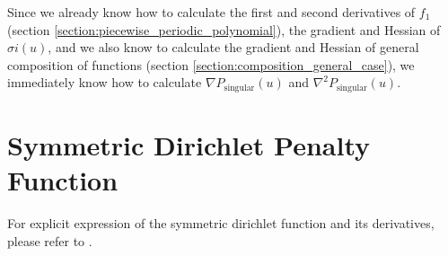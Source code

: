 \noindent Since we already know how to calculate the first and second derivatives of $f_1$ (section \ref{section:piecewise_periodic_polynomial}),  the gradient and Hessian of $\sigma{i}\left(u\right)$, and we also know to calculate the gradient and Hessian of general composition of functions (section \ref{section:composition_general_case}), we immediately know how to calculate $\nabla P_{\mathrm{singular}}\left(u\right)$ and $\nabla^2 P_{\mathrm{singular}}\left(u\right)$.

\section{Symmetric Dirichlet Penalty Function}
For explicit expression of the symmetric dirichlet function and its derivatives, please refer to \cite{Smith:2015}.